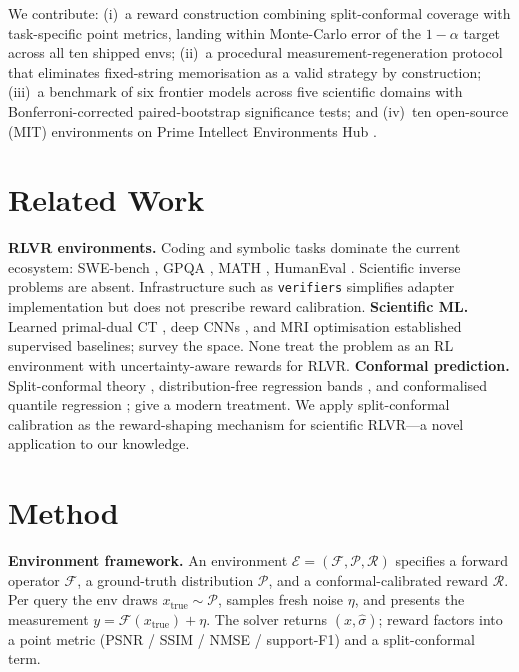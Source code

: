 \documentclass{article}
\begin{document}
We contribute: (i)~a reward construction combining split-conformal
coverage \citep{angelopoulos2023gentle, vovk2005algorithmic,
lei2014distribution} with task-specific point metrics, landing within
Monte-Carlo error of the $1{-}\alpha$ target across all ten shipped
envs; (ii)~a procedural measurement-regeneration protocol that
eliminates fixed-string memorisation as a valid strategy by
construction; (iii)~a benchmark of six frontier models across five
scientific domains with Bonferroni-corrected paired-bootstrap
significance tests; and (iv)~ten open-source (MIT) environments on
Prime Intellect Environments Hub \citep{primeintellect2024hub}.

\vspace{-3pt}
\section{Related Work}
\vspace{-2pt}

\textbf{RLVR environments.} Coding and symbolic tasks dominate the
current ecosystem: SWE-bench \citep{jimenez2024swebench}, GPQA
\citep{rein2023gpqa}, MATH \citep{hendrycks2021math}, HumanEval
\citep{chen2021humaneval}. Scientific inverse problems are absent.
Infrastructure such as \texttt{verifiers} \citep{brown2024verifiers}
simplifies adapter implementation but does not prescribe reward
calibration.
\textbf{Scientific ML.} Learned primal-dual CT
\citep{adler2018learned}, deep CNNs \citep{jin2017deep}, and MRI
optimisation \citep{fessler2020optimization} established supervised
baselines; \citet{ongie2020deep} survey the space. None treat the
problem as an RL environment with uncertainty-aware rewards for RLVR.
\textbf{Conformal prediction.} Split-conformal theory
\citep{vovk2005algorithmic}, distribution-free regression bands
\citep{lei2014distribution}, and conformalised quantile regression
\citep{romano2019conformalized}; \citet{angelopoulos2023gentle}
give a modern treatment. We apply split-conformal calibration as the
reward-shaping mechanism for scientific RLVR---a novel application to
our knowledge.

\vspace{-3pt}
\section{Method}
\vspace{-2pt}

\textbf{Environment framework.} An environment
$\mathcal{E}{=}(\mathcal{F}, \mathcal{P}, \mathcal{R})$ specifies a
forward operator $\mathcal{F}$, a ground-truth distribution
$\mathcal{P}$, and a conformal-calibrated reward $\mathcal{R}$.
Per query the env draws $x_{\mathrm{true}}{\sim}\mathcal{P}$, samples
fresh noise $\eta$, and presents the measurement
$y{=}\mathcal{F}(x_{\mathrm{true}}){+}\eta$. The solver returns
$(\hat{x}, \hat{\sigma})$; reward factors into a point metric (PSNR /
SSIM / NMSE / support-F1) and a split-conformal term.
\end{document}
